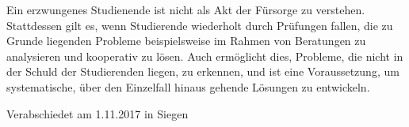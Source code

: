 \documentclass[DIV=calc]{scrartcl}
\begin{document}
Ein erzwungenes Studienende ist nicht als Akt der Fürsorge zu verstehen. Stattdessen gilt es, wenn
Studierende wiederholt durch Prüfungen fallen, die zu Grunde liegenden Probleme beispielsweise im Rahmen von Beratungen zu analysieren und kooperativ zu lösen. Auch ermöglicht dies, Probleme, die nicht in der Schuld der Studierenden liegen, zu erkennen, und ist eine Voraussetzung, um systematische, über den Einzelfall hinaus gehende Lösungen zu entwickeln.
\vspace{-0.5\baselineskip}
    \begin{flushright}
        Verabschiedet am 1.11.2017 in Siegen
    \end{flushright}
\end{document}
